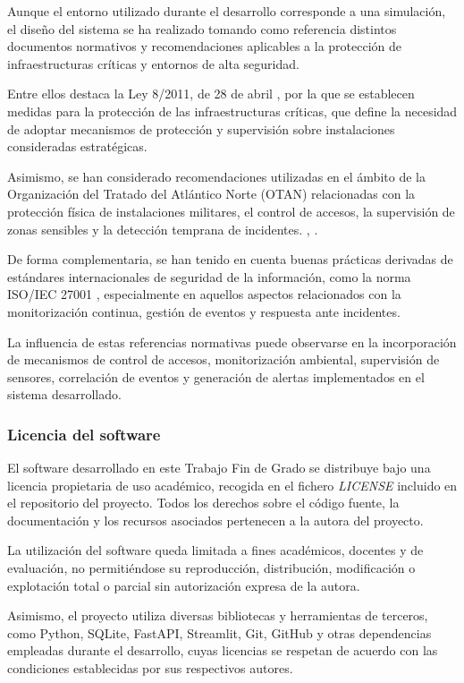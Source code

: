 Aunque el entorno utilizado durante el desarrollo corresponde a una simulación, el diseño del sistema se ha realizado tomando como referencia distintos documentos normativos y recomendaciones aplicables a la protección de infraestructuras críticas y entornos de alta seguridad.

Entre ellos destaca la Ley 8/2011, de 28 de abril \cite{ley8_2011}, por la que se establecen medidas para la protección de las infraestructuras críticas, que define la necesidad de adoptar mecanismos de protección y supervisión sobre instalaciones consideradas estratégicas.

Asimismo, se han considerado recomendaciones utilizadas en el ámbito de la Organización del Tratado del Atlántico Norte (OTAN) relacionadas con la protección física de instalaciones militares, el control de accesos, la supervisión de zonas sensibles y la detección temprana de incidentes. \cite{stanag4440}, \cite{aastp5} \cite{aastp1}.

De forma complementaria, se han tenido en cuenta buenas prácticas derivadas de estándares internacionales de seguridad de la información, como la norma ISO/IEC 27001 \cite{iso27001}, especialmente en aquellos aspectos relacionados con la monitorización continua, gestión de eventos y respuesta ante incidentes.

La influencia de estas referencias normativas puede observarse en la incorporación de mecanismos de control de accesos, monitorización ambiental, supervisión de sensores, correlación de eventos y generación de alertas implementados en el sistema desarrollado.


\subsubsection{Licencia del software}

El software desarrollado en este Trabajo Fin de Grado se distribuye bajo una licencia propietaria de uso académico, recogida en el fichero \textit{LICENSE} incluido en el repositorio del proyecto. Todos los derechos sobre el código fuente, la documentación y los recursos asociados pertenecen a la autora del proyecto.

La utilización del software queda limitada a fines académicos, docentes y de evaluación, no permitiéndose su reproducción, distribución, modificación o explotación total o parcial sin autorización expresa de la autora.

Asimismo, el proyecto utiliza diversas bibliotecas y herramientas de terceros, como Python, SQLite, FastAPI, Streamlit, Git, GitHub y otras dependencias empleadas durante el desarrollo, cuyas licencias se respetan de acuerdo con las condiciones establecidas por sus respectivos autores. 

